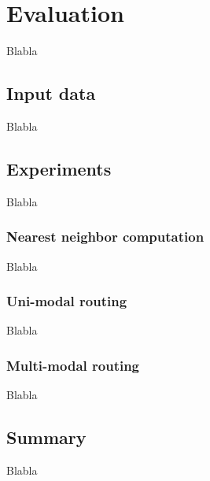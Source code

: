 \section{Evaluation}\label{evaluation}
	Blabla

\subsection{Input data}
	Blabla

\subsection{Experiments}
	Blabla

\subsubsection{Nearest neighbor computation}
	Blabla

\subsubsection{Uni-modal routing}
	Blabla

\subsubsection{Multi-modal routing}
	Blabla

\subsection{Summary}
	Blabla